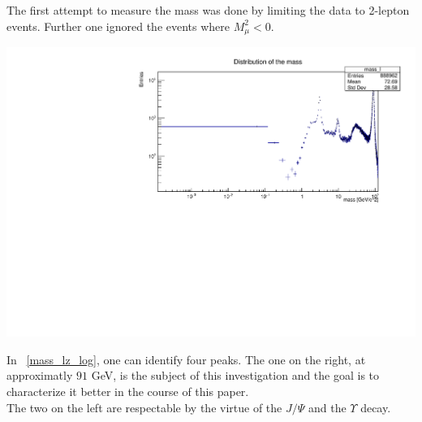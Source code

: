 \documentclass[12pt, a4paper, bibliography=totoc]{scrartcl}
\begin{document}
\begin{multicols}{2}
The first attempt to measure the mass was done by limiting the data to 2-lepton events. 
Further one ignored the events where $M_{\mu}^{2} < 0$. 
\begin{center}
	\includegraphics[width=\linewidth]{fig/mass_lz_log.pdf}
	\label{mass_lz_log}
\end{center}

In ~\ref{mass_lz_log}, one can identify four peaks. 
The one on the right, at approximatly $91$ \si{GeV}, is the subject of this investigation and the goal is to characterize it better in the course of this paper.\\
The two on the left are respectable by the virtue of the $J/{\Psi}$ and the $\Upsilon$ decay. 


\end{multicols}
\end{document}
